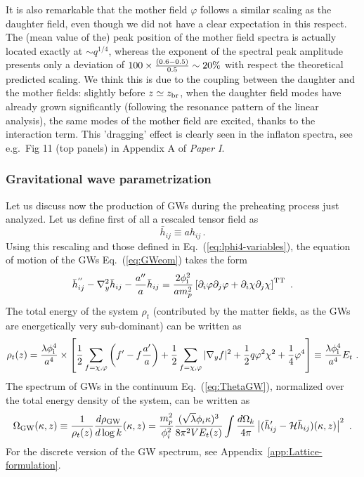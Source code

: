\documentclass[a4paper,11pt]{article}
\newcommand{\be}{\begin{equation}}
\newcommand{\ee}{\end{equation}}
\newcommand{\bea}{\begin{eqnarray}}
\newcommand{\eea}{\end{eqnarray}}
\begin{document}
It is also remarkable that the mother field $\varphi$ follows a similar scaling as the daughter field, even though we did not have a clear expectation in this respect. The (mean value of the) peak position of the mother field spectra is actually located exactly at $\sim q^{1/4}$, whereas the exponent of the spectral peak amplitude presents only a deviation of $100\times{(0.6-0.5)\over0.5} \sim 20\%$ with respect the theoretical predicted scaling. We think this is due to the coupling between the daughter and the mother fields: slightly before $z \simeq z_{\rm br}$, when the daughter field modes have already grown significantly (following the resonance pattern of the linear analysis), the same modes of the mother field are excited, thanks to the interaction term. This 'dragging' effect is clearly seen in the inflaton spectra, see e.g.~Fig 11 (top panels) in Appendix A of \textit{Paper I}.

 \subsubsection{Gravitational wave parametrization}\label{sec:lphi4-GWparam}
        
Let us discuss now the production of GWs during the preheating process just analyzed. Let us define first of all a rescaled tensor field as 
\begin{equation}
{\bar h}_{ij} \equiv a h_{ij}\,.
\end{equation}
Using this rescaling and those defined in Eq.~(\ref{eq:lphi4-variables}), the equation of motion of the GWs Eq.~(\ref{eq:GWeom}) takes the form
\be {\bar h}_{ij}^{''} - \nabla_y^2 {\bar h}_{ij} - \frac{a''}{a} {\bar h}_{ij} = \frac{2 \phi_{\rm i}^2}{a m_p^2} \left[ \partial_i \varphi \partial_j \varphi +  \partial_i \chi \partial_j \chi \right]^{\rm TT} \ . \label{eq:lphi4-GWeom} \ee
The total energy of the system $\rho_t$ (contributed by the matter fields, as the GWs are energetically very sub-dominant) can be written as
\be \rho_t (z)  = \frac{\lambda \phi_{\rm i}^4}{a^4} \times \left[  \frac{1}{2} \sum_{f=\chi,\varphi}  \left(f' - f \frac{a'}{a} \right) + \frac{1}{2} \sum_{f=\chi,\varphi} |\nabla_y f |^2 +  \frac{1}{2}  q \varphi^2 \chi^2 + \frac{1}{4} \varphi^4 \right] \equiv \frac{\lambda \phi_{\rm i}^4}{a^4} E_t \ .\ee
The spectrum of GWs in the continuum Eq.~(\ref{eq:ThetaGW}), normalized over the total energy density of the system, can be written as
\bea \Omega_{\rm GW} (\kappa, z) \equiv \frac{1}{\rho_t(z)} \frac{d \rho_{{\rm GW}}}{d \log k}(\kappa, z) = {m_p^2\over \phi_i^2}\frac{(\sqrt{\lambda}\phi_i\kappa)^3}{8 \pi^2 V E_t(z)} \int {d\Omega_k\over 4\pi} \left|({\bar h}'_{ij} - \mathcal{H} {\bar h}_{ij})(\kappa,z)\right|^2 \ . \label{eq:lphi4-GWspectra}
\eea
For the discrete version of the GW spectrum, see Appendix~\ref{app:Lattice-formulation}.
\end{document}
